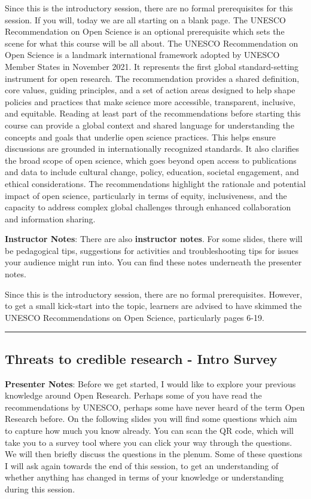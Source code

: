 \documentclass[
  english,
  letterpaper,
  DIV=11,
  numbers=noendperiod]{scrartcl}
\begin{document}
Since this is the introductory session, there are no formal
prerequisites for this session. If you will, today we are all starting
on a blank page. The UNESCO Recommendation on Open Science is an
optional prerequisite which sets the scene for what this course will be
all about. The UNESCO Recommendation on Open Science is a landmark
international framework adopted by UNESCO Member States in November
2021. It represents the first global standard-setting instrument for
open research. The recommendation provides a shared definition, core
values, guiding principles, and a set of action areas designed to help
shape policies and practices that make science more accessible,
transparent, inclusive, and equitable. Reading at least part of the
recommendations before starting this course can provide a global context
and shared language for understanding the concepts and goals that
underlie open science practices. This helps ensure discussions are
grounded in internationally recognized standards. It also clarifies the
broad scope of open science, which goes beyond open access to
publications and data to include cultural change, policy, education,
societal engagement, and ethical considerations. The recommendations
highlight the rationale and potential impact of open science,
particularly in terms of equity, inclusiveness, and the capacity to
address complex global challenges through enhanced collaboration and
information sharing.

\textbf{Instructor Notes}: There are also \textbf{instructor notes}. For
some slides, there will be pedagogical tips, suggestions for activities
and troubleshooting tips for issues your audience might run into. You
can find these notes underneath the presenter notes.

Since this is the introductory session, there are no formal
prerequisites. However, to get a small kick-start into the topic,
learners are advised to have skimmed the UNESCO Recommendations on Open
Science, particularly pages 6-19.

\begin{center}\rule{0.5\linewidth}{0.5pt}\end{center}

\subsection{Threats to credible research - Intro
Survey}\label{threats-to-credible-research---intro-survey}

\textbf{Presenter Notes}: Before we get started, I would like to explore
your previous knowledge around Open Research. Perhaps some of you have
read the recommendations by UNESCO, perhaps some have never heard of the
term Open Research before. On the following slides you will find some
questions which aim to capture how much you know already. You can scan
the QR code, which will take you to a survey tool where you can click
your way through the questions. We will then briefly discuss the
questions in the plenum. Some of these questions I will ask again
towards the end of this session, to get an understanding of whether
anything has changed in terms of your knowledge or understanding during
this session.
\end{document}
